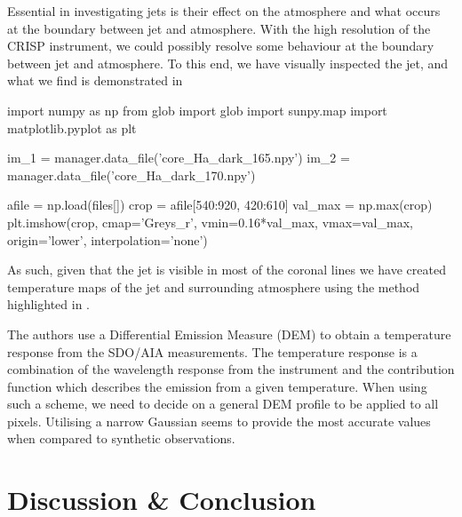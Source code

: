 \documentclass{emulateapj}
\begin{document}
Essential in investigating jets is their effect on the atmosphere and what occurs at the boundary between jet and atmosphere.
With the high resolution of the CRISP instrument, we could possibly resolve some behaviour at the boundary between jet and atmosphere. 
To this end, we have visually inspected the jet, and what we find is demonstrated in %

\begin{pycode}
import numpy as np
from glob import glob
import sunpy.map
import matplotlib.pyplot as plt

im_1 = manager.data_file('core_Ha_dark_165.npy')
im_2 = manager.data_file('core_Ha_dark_170.npy')

afile = np.load(files[])
crop = afile[540:920, 420:610]
val_max = np.max(crop)
plt.imshow(crop, cmap='Greys_r', vmin=0.16*val_max, vmax=val_max, origin='lower', interpolation='none')



\end{pycode}



As such, given that the jet is visible in most of the coronal lines we have created temperature maps of the jet and surrounding atmosphere using the method highlighted in \cite{Leonard2014}.

The authors use a Differential Emission Measure (DEM) to obtain a temperature response from the SDO/AIA measurements.
The temperature response is a combination of the wavelength response from the instrument and the contribution function which describes the emission from a given temperature.
When using such a scheme, we need to decide on a general DEM profile to be applied to all pixels.
Utilising a narrow Gaussian seems to provide the most accurate values when compared to synthetic observations.






\section{Discussion \& Conclusion}





\end{document}
